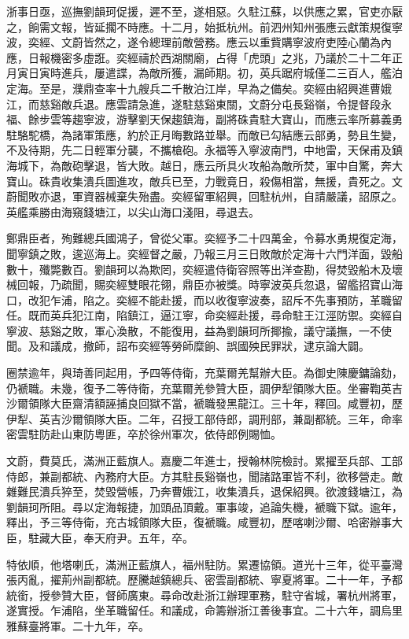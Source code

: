 \begin{pinyinscope}
浙事日亟，巡撫劉韻珂促援，遲不至，遂相惡。久駐江蘇，以供應之累，官吏亦厭之，餉需文報，皆延擱不時應。十二月，始抵杭州。前泗州知州張應云獻策規復寧波，奕經、文蔚皆然之，遂令總理前敵營務。應云以重貲購寧波府吏陸心蘭為內應，日報機密多虛誑。奕經禱於西湖關廟，占得「虎頭」之兆，乃議於二十二年正月寅日寅時進兵，屢遣諜，為敵所獲，漏師期。初，英兵踞府城僅二三百人，艦泊定海。至是，濮鼎查率十九艘兵二千散泊江岸，早為之備矣。奕經由紹興進曹娥江，而慈谿敵兵退。應雲請急進，遂駐慈谿東關，文蔚分屯長谿嶺，令提督段永福、餘步雲等趨寧波，游擊劉天保趨鎮海，副將硃貴駐大寶山，而應云率所募義勇駐駱駝橋，為諸軍策應，約於正月晦數路並舉。而敵已勾結應云部勇，勢且生變，不及待期，先二日輕軍分襲，不攜槍砲。永福等入寧波南門，中地雷，天保甫及鎮海城下，為敵砲擊退，皆大敗。越日，應云所具火攻船為敵所焚，軍中自驚，奔大寶山。硃貴收集潰兵圖進攻，敵兵已至，力戰竟日，殺傷相當，無援，貴死之。文蔚聞敗亦退，軍資器械棄失殆盡。奕經留軍紹興，回駐杭州，自請嚴議，詔原之。英艦乘勝由海窺錢塘江，以尖山海口淺阻，尋退去。

鄭鼎臣者，殉難總兵國鴻子，曾從父軍。奕經予二十四萬金，令募水勇規復定海，聞寧鎮之敗，逡巡海上。奕經督之嚴，乃報三月三日敗敵於定海十六門洋面，毀船數十，殲斃數百。劉韻珂以為欺罔，奕經遣侍衛容照等出洋查勘，得焚毀船木及壞械回報，乃疏聞，賜奕經雙眼花翎，鼎臣亦被獎。時寧波英兵忽退，留艦招寶山海口，改犯乍浦，陷之。奕經不能赴援，而以收復寧波奏，詔斥不先事預防，革職留任。既而英兵犯江南，陷鎮江，逼江寧，命奕經赴援，尋命駐王江涇防禦。奕經自寧波、慈谿之敗，軍心渙散，不能復用，益為劉韻珂所揶揄，議守議撫，一不使聞。及和議成，撤師，詔布奕經等勞師糜餉、誤國殃民罪狀，逮京論大闢。

圈禁逾年，與琦善同起用，予四等侍衛，充葉爾羌幫辦大臣。為御史陳慶鏞論劾，仍褫職。未幾，復予二等侍衛，充葉爾羌參贊大臣，調伊犁領隊大臣。坐審鞫英吉沙爾領隊大臣齋清額誣捕良回獄不當，褫職發黑龍江。三十年，釋回。咸豐初，歷伊犁、英吉沙爾領隊大臣。二年，召授工部侍郎，調刑部，兼副都統。三年，命率密雲駐防赴山東防粵匪，卒於徐州軍次，依侍郎例賜恤。

文蔚，費莫氏，滿洲正藍旗人。嘉慶二年進士，授翰林院檢討。累擢至兵部、工部侍郎，兼副都統、內務府大臣。方其駐長谿嶺也，聞諸路軍皆不利，欲移營走。敵雜難民潰兵猝至，焚毀營帳，乃奔曹娥江，收集潰兵，退保紹興。欲渡錢塘江，為劉韻珂所阻。尋以定海報捷，加頭品頂戴。軍事竣，追論失機，褫職下獄。逾年，釋出，予三等侍衛，充古城領隊大臣，復褫職。咸豐初，歷喀喇沙爾、哈密辦事大臣，駐藏大臣，奉天府尹。五年，卒。

特依順，他塔喇氏，滿洲正藍旗人，福州駐防。累遷協領。道光十三年，從平臺灣張丙亂，擢荊州副都統。歷騰越鎮總兵、密雲副都統、寧夏將軍。二十一年，予都統銜，授參贊大臣，督師廣東。尋命改赴浙江辦理軍務，駐守省城，署杭州將軍，遂實授。乍浦陷，坐革職留任。和議成，命籌辦浙江善後事宜。二十六年，調烏里雅蘇臺將軍。二十九年，卒。


\end{pinyinscope}
